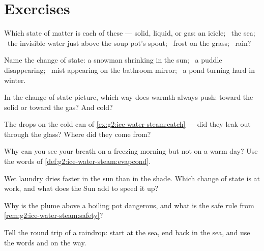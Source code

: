 \section{Exercises}

\begin{exercise}[$\star$]\label{exo:g2:ice-water-steam:1}
Which state of matter is each of these --- solid, liquid, or gas:
an icicle; \ the sea; \ the invisible water just above the soup pot's
spout; \ frost on the grass; \ rain?
\end{exercise}

\begin{exercise}[$\star$]\label{exo:g2:ice-water-steam:2}
Name the change of state: a snowman shrinking in the sun; \ a puddle
disappearing; \ mist appearing on the bathroom mirror; \ a pond
turning hard in winter.
\end{exercise}

\begin{exercise}[$\star$]\label{exo:g2:ice-water-steam:3}
In the change-of-state picture, which way does warmth always push:
toward the solid or toward the gas? And cold?
\end{exercise}

\begin{exercise}[$\star$]\label{exo:g2:ice-water-steam:4}
The drops on the cold can of \cref{ex:g2:ice-water-steam:catch} ---
did they leak out through the glass? Where did they come from?
\end{exercise}

\begin{exercise}[$\star$]\label{exo:g2:ice-water-steam:5}
Why can you see your breath on a freezing morning but not on a warm
day? Use the words of \cref{def:g2:ice-water-steam:evapcond}.
\end{exercise}

\begin{exercise}[$\star$]\label{exo:g2:ice-water-steam:6}
Wet laundry dries faster in the sun than in the shade. Which change
of state is at work, and what does the Sun add to speed it up?
\end{exercise}

\begin{exercise}[$\star$]\label{exo:g2:ice-water-steam:7}
Why is the plume above a boiling pot dangerous, and what is the safe
rule from \cref{rem:g2:ice-water-steam:safety}?
\end{exercise}

\begin{exercise}[$\star$]\label{exo:g2:ice-water-steam:8}
Tell the round trip of a raindrop: start at the sea, end back in the
sea, and use the words  and  on the way.
\end{exercise}

